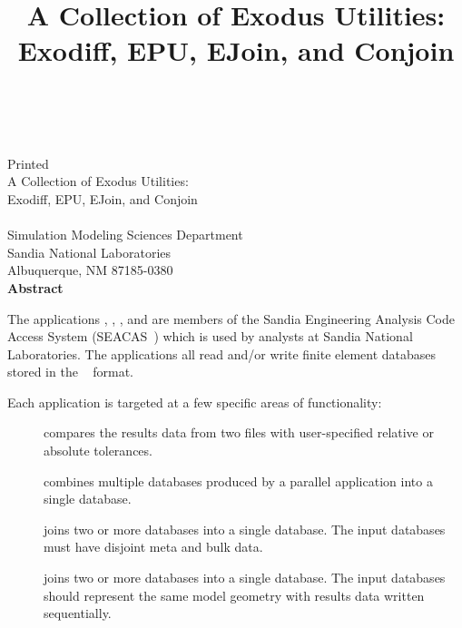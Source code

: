 \newif\ifdraft\draftfalse
\newif\ifsand\sandtrue

\SANDprintDate{\today}
\newcommand{\theTitle}{A Collection of Exodus Utilities:\\Exodiff, EPU, EJoin, and Conjoin}
\title{\theTitle}
\ifsand
{}
\doCover
\newpage
\else
\SANDmarks{cover}
\setcounter{page}{3}
\fi


\begin{center}
\SANDnumVar\\
\SANDreleaseTypeVar\\
\ifdraft
Draft Date: \SANDprintDateVar\\
\else
Printed \SANDprintDateVar\\
\fi

\vspace{0.75in}
\theTitle\\
\vspace{0.75in}
\SANDauthorVar\\
Simulation Modeling Sciences Department\\
Sandia National Laboratories\\
Albuquerque, NM 87185-0380\\
\vspace*{.5in}
\textbf{Abstract}
\end{center}
\vspace{-.4cm}\par

The applications \exodiff{}, \epu{}, \ejoin{}, and \conjoin{} are
members of the Sandia Engineering Analysis Code Access System
(SEACAS~\cite{bib:seacas}) which is used by analysts at Sandia
National Laboratories.  The applications all read and/or write finite
element databases stored in the \exo{}~\cite{bib:exodus} format.

Each application is targeted at a few specific areas of functionality:

\begin{description}
\item[\exodiff] compares the results data from two \exo{} files with
user-specified relative or absolute tolerances.

\item[\epu] combines multiple \exo{} databases produced by a parallel
application into a single \exo{} database.

\item[\ejoin] joins two or more \exo{} databases into a single
\exo{} database. The input databases must have disjoint meta and bulk data.

\item[\conjoin] joins two or more \exo{} databases into a single
database. The input databases should represent the same model geometry
with results data written sequentially.
\end{description}
